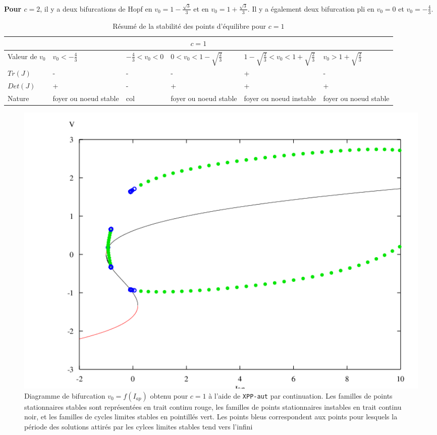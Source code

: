 \documentclass[12pt,a4paper,onecolumn]{article}
\begin{document}
\textbf{Pour $c=2$}, il y a deux bifurcations de Hopf en $v_0 = 1 - \frac{\sqrt{3}}{3}$ et en $v_0 = 1 + \frac{\sqrt{3}}{3}$. Il y a également deux bifurcation pli en $v_0 = 0$ et $v_0 = -\frac{4}{3}$.

\newpage

\begin{table}[H]
\begin{tabular}{|L{2cm} | C{2cm} | C{2.5cm} | C{2.5cm} |C{2.5cm}|C{2.5cm}|}
\hline
{}
\\\hline
Valeur de $v_0$ & $v_0 < - \frac{4}{3}$ & $- \frac{4}{3} < v_0 < 0$ & $0 < v_0 < 1 - \sqrt{\frac{2}{3}}$ & $1 - \sqrt{\frac{2}{3}} < v_0 < 1 + \sqrt{\frac{2}{3}}$ &$v_0 > 1 + \sqrt{\frac{2}{3}}$ \\
 \hline
$Tr(J)$ & - & - & - & + & - \\ \hline
$Det(J)$ & + & - & + & + &+ \\ \hline
Nature & foyer ou noeud stable  & col & foyer ou noeud stable & foyer ou noeud instable & foyer ou noeud stable \\ \hline
\end{tabular}
\caption{Résumé de la stabilité des points d'équilibre pour $c = 1$}
\label{resume_c_2}
\end{table}

\begin{figure}[H]
\begin{center}
\includegraphics[width = 1.0\textwidth]{bif_10.png}
\end{center}
\caption{Diagramme de bifurcation $v_0=f(I_{ap})$ obtenu pour $c=1$ à l'aide de \texttt{XPP-aut} par continuation. Les familles de points stationnaires stables sont représentées en trait continu rouge, les familles de points stationnaires instables en trait continu noir, et les familles de cycles limites stables en pointillés vert. Les points bleus correspondent aux points pour lesquels la période des solutions attirés par les cylces limites stables tend vers l'infini}
\label{fig_res_c_1}
\end{figure}
\end{document}
